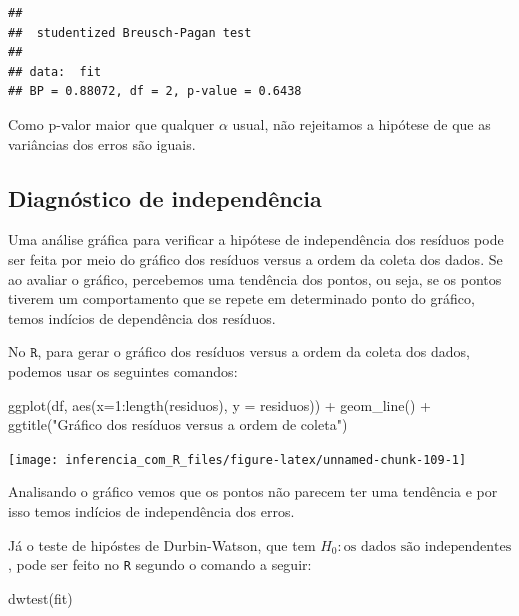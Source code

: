\documentclass[
]{book}
\newenvironment{Shaded}{\begin{snugshade}}{\end{snugshade}}
\newcommand{\AttributeTok}[1]{\textcolor[rgb]{0.77,0.63,0.00}{#1}}
\newcommand{\DecValTok}[1]{\textcolor[rgb]{0.00,0.00,0.81}{#1}}
\newcommand{\FunctionTok}[1]{\textcolor[rgb]{0.00,0.00,0.00}{#1}}
\newcommand{\NormalTok}[1]{#1}
\newcommand{\SpecialCharTok}[1]{\textcolor[rgb]{0.00,0.00,0.00}{#1}}
\newcommand{\StringTok}[1]{\textcolor[rgb]{0.31,0.60,0.02}{#1}}
\begin{document}
\begin{verbatim}
## 
##  studentized Breusch-Pagan test
## 
## data:  fit
## BP = 0.88072, df = 2, p-value = 0.6438
\end{verbatim}

Como p-valor maior que qualquer \(\alpha\) usual, não rejeitamos a hipótese de que as variâncias dos erros são iguais.

\hypertarget{diagnuxf3stico-de-independuxeancia}{%
\subsection{Diagnóstico de independência}\label{diagnuxf3stico-de-independuxeancia}}

Uma análise gráfica para verificar a hipótese de independência dos resíduos pode ser feita por meio do gráfico dos resíduos versus a ordem da coleta dos dados. Se ao avaliar o gráfico, percebemos uma tendência dos pontos, ou seja, se os pontos tiverem um comportamento que se repete em determinado ponto do gráfico, temos indícios de dependência dos resíduos.

No \(\texttt{R}\), para gerar o gráfico dos resíduos versus a ordem da coleta dos dados, podemos usar os seguintes comandos:

\begin{Shaded}
\begin{Highlighting}[]
\FunctionTok{ggplot}\NormalTok{(df, }\FunctionTok{aes}\NormalTok{(}\AttributeTok{x=}\DecValTok{1}\SpecialCharTok{:}\FunctionTok{length}\NormalTok{(residuos), }\AttributeTok{y =}\NormalTok{ residuos)) }\SpecialCharTok{+}
  \FunctionTok{geom\_line}\NormalTok{() }\SpecialCharTok{+}
  \FunctionTok{ggtitle}\NormalTok{(}\StringTok{"Gráfico dos resíduos versus a ordem de coleta"}\NormalTok{)}
\end{Highlighting}
\end{Shaded}

\begin{center}\texttt{[image: inferencia\_com\_R\_files/figure-latex/unnamed-chunk-109-1]} \end{center}

Analisando o gráfico vemos que os pontos não parecem ter uma tendência e por isso temos indícios de independência dos erros.

Já o teste de hipóstes de Durbin-Watson, que tem \(H_0:\text{os dados são independentes}\), pode ser feito no \texttt{R} segundo o comando a seguir:

\begin{Shaded}
\begin{Highlighting}[]
\FunctionTok{dwtest}\NormalTok{(fit)}
\end{Highlighting}
\end{Shaded}
\end{document}
